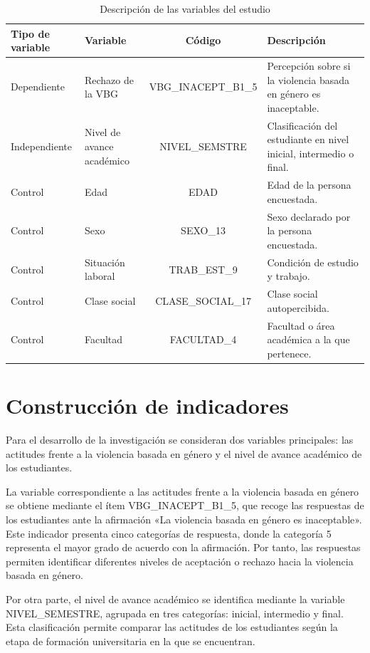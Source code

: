 \documentclass[
  spanish,
  11pt,
  letterpaper,
  DIV=11,
  numbers=noendperiod]{scrreprt}
\begin{document}
\begin{longtable}[t]{llcl}

\caption{\label{tbl-variables}Descripción de las variables del estudio}

\tabularnewline

\toprule
\textbf{Tipo de variable} & \textbf{Variable} & \textbf{Código} & \textbf{Descripción}\\
\midrule
Dependiente & Rechazo de la VBG & VBG\_INACEPT\_B1\_5 & Percepción sobre si la violencia basada en género es inaceptable.\\
Independiente & Nivel de avance académico & NIVEL\_SEMSTRE & Clasificación del estudiante en nivel inicial, intermedio o final.\\
Control & Edad & EDAD & Edad de la persona encuestada.\\
Control & Sexo & SEXO\_13 & Sexo declarado por la persona encuestada.\\
Control & Situación laboral & TRAB\_EST\_9 & Condición de estudio y trabajo.\\
\addlinespace
Control & Clase social & CLASE\_SOCIAL\_17 & Clase social autopercibida.\\
Control & Facultad & FACULTAD\_4 & Facultad o área académica a la que pertenece.\\
\bottomrule

\end{longtable}

\endgroup{}

\section{Construcción de
indicadores}\label{construcciuxf3n-de-indicadores}

Para el desarrollo de la investigación se consideran dos variables
principales: las actitudes frente a la violencia basada en género y el
nivel de avance académico de los estudiantes.

La variable correspondiente a las actitudes frente a la violencia basada
en género se obtiene mediante el ítem VBG\_INACEPT\_B1\_5, que recoge
las respuestas de los estudiantes ante la afirmación «La violencia
basada en género es inaceptable». Este indicador presenta cinco
categorías de respuesta, donde la categoría 5 representa el mayor grado
de acuerdo con la afirmación. Por tanto, las respuestas permiten
identificar diferentes niveles de aceptación o rechazo hacia la
violencia basada en género.

Por otra parte, el nivel de avance académico se identifica mediante la
variable NIVEL\_SEMESTRE, agrupada en tres categorías: inicial,
intermedio y final. Esta clasificación permite comparar las actitudes de
los estudiantes según la etapa de formación universitaria en la que se
encuentran.
\end{document}
